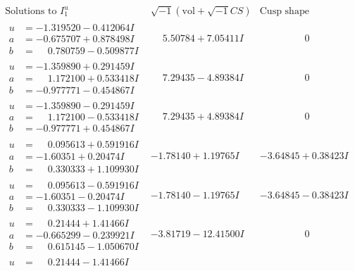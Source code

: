 \documentclass[1p]{elsarticle_modified}
\theoremstyle{definition}
\newcommand{\I}{\sqrt{-1}}
\begin{document}
$$\begin{array}{c|c|c}
\text{Solutions to }I^u_{1}& \I (\text{vol} + \sqrt{-1}CS) & \text{Cusp shape}\\
 \hline 
\begin{aligned}
u &= -1.319520 - 0.412064 I \\
a &= -0.675707 + 0.878498 I \\
b &= \phantom{-}0.780759 - 0.509877 I\end{aligned}
 & \phantom{-}5.50784 + 7.05411 I & \phantom{-0.000000 } 0 \\ \hline\begin{aligned}
u &= -1.359890 + 0.291459 I \\
a &= \phantom{-}1.172100 + 0.533418 I \\
b &= -0.977771 - 0.454867 I\end{aligned}
 & \phantom{-}7.29435 - 4.89384 I & \phantom{-0.000000 } 0 \\ \hline\begin{aligned}
u &= -1.359890 - 0.291459 I \\
a &= \phantom{-}1.172100 - 0.533418 I \\
b &= -0.977771 + 0.454867 I\end{aligned}
 & \phantom{-}7.29435 + 4.89384 I & \phantom{-0.000000 } 0 \\ \hline\begin{aligned}
u &= \phantom{-}0.095613 + 0.591916 I \\
a &= -1.60351 + 0.20474 I \\
b &= \phantom{-}0.330333 + 1.109930 I\end{aligned}
 & -1.78140 + 1.19765 I & -3.64845 + 0.38423 I \\ \hline\begin{aligned}
u &= \phantom{-}0.095613 - 0.591916 I \\
a &= -1.60351 - 0.20474 I \\
b &= \phantom{-}0.330333 - 1.109930 I\end{aligned}
 & -1.78140 - 1.19765 I & -3.64845 - 0.38423 I \\ \hline\begin{aligned}
u &= \phantom{-}0.21444 + 1.41466 I \\
a &= -0.665299 - 0.239921 I \\
b &= \phantom{-}0.615145 - 1.050670 I\end{aligned}
 & -3.81719 - 12.41500 I & \phantom{-0.000000 } 0 \\ \hline\begin{aligned}
u &= \phantom{-}0.21444 - 1.41466 I \\

\end{aligned}
\end{array}$$
\end{document}
